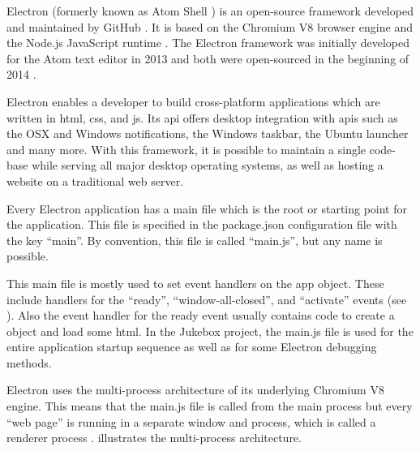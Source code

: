 

Electron (formerly known as Atom Shell \cite{atomShell}) is an open-source framework developed and maintained by GitHub \cite{electron}. It is based on the Chromium V8 browser engine \cite{chromium} and the Node.js JavaScript runtime \cite{nodejs}. The Electron framework was initially developed for the Atom text editor \cite{atom} in 2013 and both were open-sourced in the beginning of 2014 \cite{aboutElectron}.

Electron enables a developer to build cross-platform applications which are written in \gls{html}, \gls{css}, and \gls{js}. Its \gls{api} offers desktop integration with \gls{api}s such as the OSX and Windows notifications, the Windows taskbar, the Ubuntu launcher and many more. With this framework, it is possible to maintain a single code-base while serving all major desktop operating systems, as well as hosting a website on a traditional web server.


Every Electron application has a main file which is the root or starting point for the application. This file is specified in the package.json configuration file with the key \enquote{main}. By convention, this file is called \enquote{main.js}, but any name is possible.

This main file is mostly used to set event handlers on the app object. These include handlers for the \enquote{ready}, \enquote{window-all-closed}, and \enquote{activate} events (see ). Also the event handler for the ready event usually contains code to create a  object and load some \gls{html}. In the Jukebox project, the main.js file is used for the entire application startup sequence as well as for some Electron debugging methods.


Electron uses the multi-process architecture of its underlying Chromium V8 engine. This means that the main.js file is called from the main process but every \enquote{web page} is running in a separate window and process, which is called a renderer process \cite{electronAppArch}.  illustrates the multi-process architecture.


